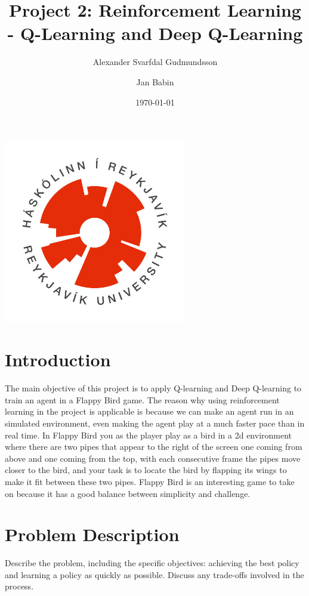 \documentclass[a4paper,12pt]{article}
\title{Project 2: Reinforcement Learning - Q-Learning and Deep Q-Learning}
\author{Alexander Svarfdal Gudmundsson \and Jan Babin}
\date{\today}
\begin{document}
\maketitle

\begin{center}  
    \includegraphics[width=0.6\textwidth]{HR_logo.jpg}
\end{center}

\clearpage

\tableofcontents

\clearpage

\section{Introduction}
The main objective of this project is to apply Q-learning and Deep Q-learning to train an agent in a Flappy Bird game. 
The reason why using reinforcement learning in the project is applicable is because we can make an agent run in an simulated environment, 
even making the agent play at a much faster pace than in real time. 
In Flappy Bird you as the player play as a bird in a 2d environment where there are two pipes that appear to the right of the screen one coming from above and one coming from the top, 
with each consecutive frame the pipes move closer to the bird, and your task is to locate the bird by flapping its wings to make it fit between these two pipes. 
Flappy Bird is an interesting game to take on because it has a good balance between simplicity and challenge. 

\section{Problem Description}
Describe the problem, including the specific objectives: achieving the best policy and learning a policy as quickly as possible. Discuss any trade-offs involved in the process.
\end{document}
